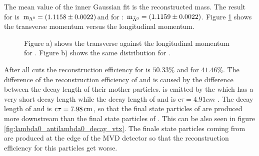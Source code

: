 		The mean value of the inner Gaussian fit is the reconstructed mass.
		The result for \lam is $\textnormal{m}_{\Lambda^0} = \left(1.1158 \pm 0.0022\right)$\massunit and for \alam: $\textnormal{m}_{\bar{\Lambda}^0} = \left(1.1159 \pm 0.0022\right)$\massunit. 
		Figure \ref{fig:lambda0_pt_vs_pz} shows the transverse momentum versus the longitudinal momentum.
				
		\begin{figure}
			
			\caption{\propose Figure a) shows the transverse against the longitudinal momentum for \lam. Figure b) shows the same distribution for \alam.}
			\label{fig:lambda0_pt_vs_pz}
		
		\end{figure}
		After all cuts the reconstruction efficiency for \lam is $50.33\%$ and for \alam $41.46\%$.
		The difference of the reconstruction efficiency of \lam and \alam is caused by the difference between the decay length of their mother particles.
		\lam is emitted by the \excitedcascade which has a very short decay length while the decay length of \cascade and \anticascade is 
		c$\tau = 4.91 \unit{cm}$ \cite{PDG}.
		The decay length of \lam and \alam is $\textnormal{c}\tau = 7.98 \, \textnormal{cm}$, so that the final state particles of \alam are produced more downstream 
		than the final state particles of \lam.
		This can be also seen in figure \ref{fig:lambda0_antilambda0_decay_vtx}.
		The finale state particles coming from \alam are produced at the edge of the MVD detector so that the reconstruction efficiency for this particles get worse.
		
